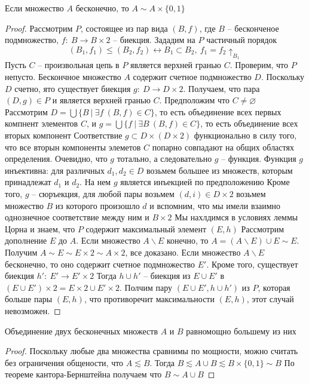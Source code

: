 \begin{lem}
Если множество $A$ бесконечно, то $A \sim A \times \{0,1\}$
\end{lem}
\begin{proof}
Рассмотрим $P$, состоящее из пар вида $(B,f)$, где $B$ -- бесконченое подмножество, $f:\ B \to B \times 2$ -- биекция. Зададим на $P$ частичный порядок
$$
	(B_1,f_1) \leqslant (B_2,f_2) \leftrightarrow B_1 \subset B_2,\ f_1 = f_2 \uparrow_{B_1}
$$
Пусть $C$ -- произвольная цепь в $P$ является верхней гранью $C$. Проверим, что $P$ непусто. Бескончное множество $A$ содержит счетное подмножество $D$. Поскольку $D$ счетно, ято существует биекция $g:\ D \to D \times 2$. Получаем, что пара $(D,g) \in P$ и является верхней гранью $C$.
\vskip 0.1in
Предположим что $C \ne \varnothing$\\
Рассмотрим $D = \bigcup\{B\ |\ \exists f\ (B,f) \in C\}$, то есть объединение всех первых компнент элементов $C$, и $g = \bigcup\{f\ |\ \exists B\ (B,f) \in C\}$, то есть объединение всех вторых компонент
\vskip 0.1in
Соответствие $g \subset D \times (D \times 2)$ функционально в силу того, что все вторын компоненты элеметов $C$ попарно совпадают на общих областях определения. Очевидно, что $g$ тотально, а следовательно $g$ -- функция.
\vskip 0.1in
Функция $g$ инъективна: для различных $d_1, d_2 \in D$ возьмем большее из множеств, которым принадлежат $d_1$ и $d_2$. На нем $g$ является инъекцией по предположению
\vskip 0.1in
Кроме того, $g$ -- сюръекция, для любой пары возьмем $(d, i) \in D \times 2$ возьмем множество $B$ из которого произошло $d$ и вспомним, что мы имели взаимно однознечное соответствие между ним и $B \times 2$
\vskip 0.1in
Мы нахлдимся в условиях леммы Цорна и знаем, что $P$ содержит максимальный элемент $(E,h)$
\vskip 0.1in
Рассмотрим дополнение $E$ до $A$. Если множество $A \backslash E$ конечно, то $A = (A \backslash E) \cup E \sim E$. Получим $A \sim E \sim E \times 2 \sim A \times 2$, все доказано.
\vskip 0.1in
Если множество $A \backslash E$ бесконечно, то оно содержит счетное подмножество $E'$. Кроме того, существует биекция $h':\ E'\to E'\times 2$
\vskip 0.1in
Тогда $h \cup h'$ -- биекция из $E \cup E'$ в $(E \cup E') \times 2 = E \times 2 \cup E'\times 2$. Полчим пару $(E \cup E', h \cup h')$ из $P$, которая больше пары $(E,h)$, что противоречит максимальности $(E,h)$, этот случай невозможен.
\end{proof}

\begin{theo}
Объединение двух бесконечных множеств $A$ и $B$ равномощно большему из них 
\end{theo}
\begin{proof}
Поскольку любые два множества сравнимы по мощности, можно считать без ограничения общености, что $A \lesssim B$. Тогда $B \lesssim A \cup B \lesssim B \times \{0,1\} \sim B$
По теореме кантора-Бернштейна получаем что $B \sim A \cup B$
\end{proof}

